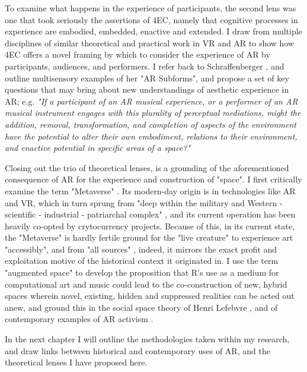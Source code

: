 To examine what happens in the experience of participants, the second lens was one that took seriously the assertions of 4EC, namely that cognitive processes in experience are embodied, embedded, enactive and extended. I draw from multiple disciplines of similar theoretical and practical work in VR and AR to show how 4EC offers a novel framing by which to consider the experience of AR by participants, audiences, and performers. I refer back to Schraffenberger \citeyearpar{schraffenberger2018}, and outline multisensory examples of her "AR Subforms", and propose a set of key questions that may bring about new understandings of aesthetic experience in AR; e.g. \textit{"If a participant of an AR musical experience, or a performer of an AR musical instrument engages with this plurality of perceptual mediations, might the addition, removal, transformation, and completion of aspects of the environment have the potential to alter their own embodiment, relations to their environment, and enactive potential in specific areas of a space?"}

Closing out the trio of theoretical lenses, is a grounding of the aforementioned consequence of AR for the experience and construction of "space". I first critically examine the term "Metaverse" \citep{stephenson1992}. Its modern-day origin is in technologies like AR and VR, which in turn sprung from "deep within the military and Western - scientific - industrial - patriarchal complex" \cite{davies2004}, and its current operation has been heavily co-opted by crytocurrency projects. Because of this, in its current state, the "Metaverse" is hardly fertile ground for the "live creature" to experience art "accessibly", and from "all sources" \citep{dewey1934,leddy2021}, indeed, it mirrors the exact profit and exploitation motive of the historical context it originated in. I use the term "augmented space" \citep{manovich2006} to develop the proposition that R’s use as a medium for computational art and music could lead to the co-construction of new, hybrid spaces wherein novel, existing, hidden and suppressed realities can be acted out anew, and ground this in the social space theory of Henri Lefebvre \citeyearpar{lefebvre1991}, and of contemporary examples of AR activism \citep{veenhof2010,thiel2011,thiel2018,skwarek2018}.

In the next chapter I will outline the methodologies taken within my research, and draw links between historical and contemporary uses of AR, and the theoretical lenses I have proposed here.

\clearpage
%

%  
